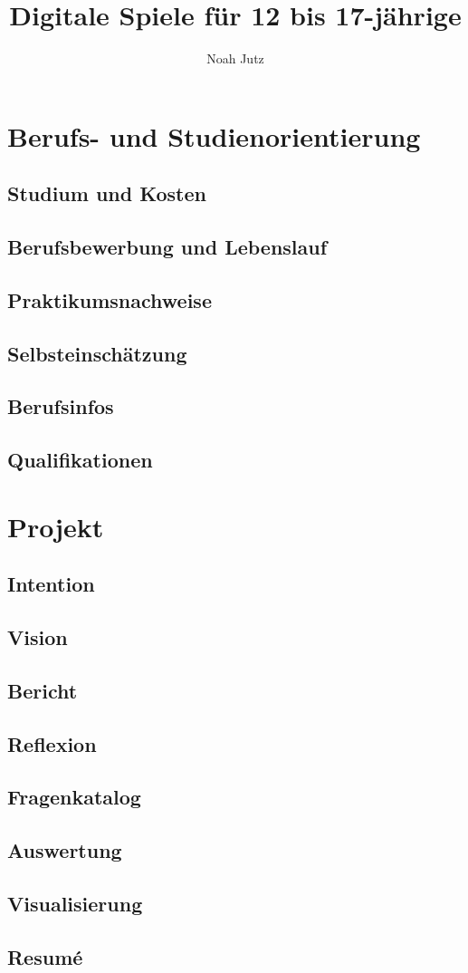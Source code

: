 \documentclass[12pt]{article}
\title{Digitale Spiele für 12 bis 17-jährige}
\author{Noah Jutz}
\date{}
\begin{document}
    \maketitle

    \newpage
    \tableofcontents

    \newpage
    \section{Berufs- und Studienorientierung}
    \subsection{Studium und Kosten}
    \subsection{Berufsbewerbung und Lebenslauf}
    \subsection{Praktikumsnachweise}
    \subsection{Selbsteinschätzung}
    \subsection{Berufsinfos}
    \subsection{Qualifikationen}
    \section{Projekt}
    \subsection{Intention}
    \subsection{Vision}
    \subsection{Bericht}
    \subsection{Reflexion}
    \subsection{Fragenkatalog}
    \subsection{Auswertung}
    \subsection{Visualisierung}
    \subsection{Resumé}
\end{document}
